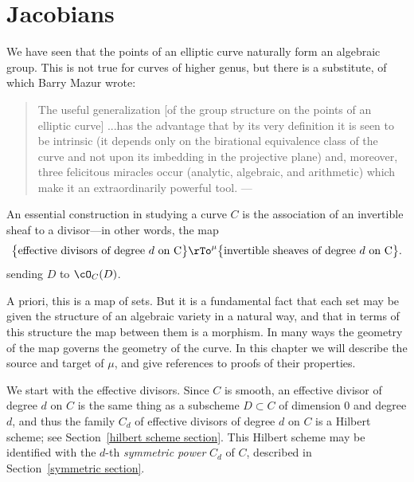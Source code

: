 

\chapter{Jacobians}\label{Jacobians chapter}\label{new Jacobians chapter}\label{JacobianChapter}

We have seen that the points of an elliptic curve naturally form an algebraic group. This is not true for curves of higher genus, but there is a substitute, of which Barry Mazur wrote:

\begin{quote}
The useful generalization [of the group structure on the points of an elliptic curve]
...has the advantage that by its
very definition it is seen to be intrinsic (it depends only on the birational
equivalence class of the curve and not upon its imbedding in the projective
plane) and, moreover, three felicitous miracles occur (analytic, algebraic, and
arithmetic) which make it an extraordinarily powerful tool. --- \cite{MazurBulletin}
\end{quote}

An essential construction in studying a curve $C$ is the association of an invertible sheaf to a divisor---in other words, the map
$$
\big\{ \text{effective divisors of degree $d$ on C}\big\} \rTo^\mu \big\{ \text{invertible sheaves of degree $d$ on C} \big\}.
$$
sending $D$ to $\cO_C(D)$.

A priori, this is a map of sets. But it is a fundamental fact that each set may  be given the structure of an algebraic variety in a natural way, and that in terms of this structure the map between them is a morphism. In many ways the geometry of the map governs the geometry of the curve.
In this chapter we will describe the source and target of $\mu$, and give references to proofs of their properties. 

We start with the effective divisors. Since $C$ is smooth, an effective divisor of degree $d$ on $C$ is the same thing as a subscheme $D \subset C$ of dimension 0 and degree $d$, and thus
the family $C_d$ of effective divisors of degree $d$ on $C$ is a Hilbert scheme; see Section~\ref{hilbert scheme section}. This Hilbert scheme may be identified with
the $d$-th \emph{symmetric power} $C_d$  of $C$, described in Section~\ref{symmetric section}. 


